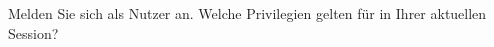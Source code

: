     \item Melden Sie sich als Nutzer  an. Welche Privilegien gelten f\"ur  in Ihrer aktuellen Session?